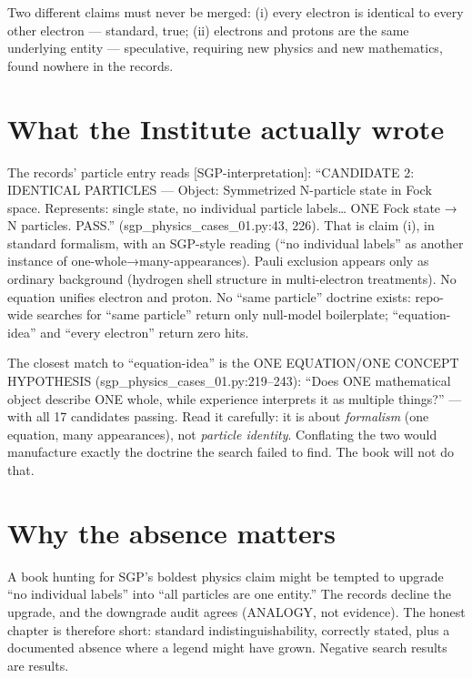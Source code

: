\documentclass[
  11pt,
]{book}
\begin{document}
Two different claims must never be merged: (i) every electron is
identical to every other electron --- standard, true; (ii) electrons and
protons are the same underlying entity --- speculative, requiring new
physics and new mathematics, found nowhere in the records.

\section{What the Institute actually
wrote}\label{what-the-institute-actually-wrote}

The records' particle entry reads {[}SGP-interpretation{]}: ``CANDIDATE
2: IDENTICAL PARTICLES --- Object: Symmetrized N-particle state in Fock
space. Represents: single state, no individual particle labels\ldots{}
ONE Fock state → N particles. PASS.'' (sgp\_physics\_cases\_01.py:43,
226). That is claim (i), in standard formalism, with an SGP-style
reading (``no individual labels'' as another instance of
one-whole→many-appearances). Pauli exclusion appears only as ordinary
background (hydrogen shell structure in multi-electron treatments). No
equation unifies electron and proton. No ``same particle'' doctrine
exists: repo-wide searches for ``same particle'' return only null-model
boilerplate; ``equation-idea'' and ``every electron'' return zero hits.

The closest match to ``equation-idea'' is the ONE EQUATION/ONE CONCEPT
HYPOTHESIS (sgp\_physics\_cases\_01.py:219--243): ``Does ONE
mathematical object describe ONE whole, while experience interprets it
as multiple things?'' --- with all 17 candidates passing. Read it
carefully: it is about \emph{formalism} (one equation, many
appearances), not \emph{particle identity}. Conflating the two would
manufacture exactly the doctrine the search failed to find. The book
will not do that.

\section{Why the absence matters}\label{why-the-absence-matters}

A book hunting for SGP's boldest physics claim might be tempted to
upgrade ``no individual labels'' into ``all particles are one entity.''
The records decline the upgrade, and the downgrade audit agrees
(ANALOGY, not evidence). The honest chapter is therefore short: standard
indistinguishability, correctly stated, plus a documented absence where
a legend might have grown. Negative search results are results.
\end{document}
